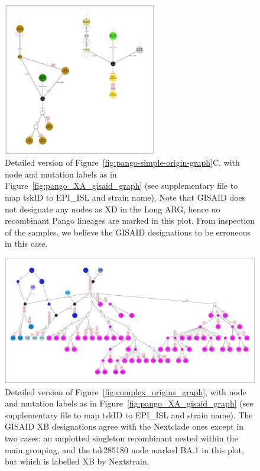 \documentclass{article}
\begin{document}
\begin{figure} \centering
\includegraphics[width=0.6\textwidth]{figures/Pango_XD_gisaid_large_graph.pdf}
\caption{\label{fig:pango_XD_gisaid_graph}
Detailed version of Figure~\ref{fig:pango-simple-origin-graph}C, with node and mutation labels as in
Figure~\ref{fig:pango_XA_gisaid_graph} (see supplementary file \protect{}
to map tskID to EPI\_ISL and strain name).
Note that GISAID does not designate any nodes as XD in the Long ARG, hence no recombinant Pango lineages
are marked in this plot. From inspection of the samples, we believe the GISAID designations to be erroneous
in this case.
}
\end{figure}

\begin{figure} \centering
\includegraphics[width=\textwidth]{figures/Pango_XB_gisaid_large_graph.pdf}
\caption{\label{fig:pango_XB_gisaid_graph}
Detailed version of Figure~\ref{fig:complex_origins_graph}, with node and mutation labels as in
Figure~\ref{fig:pango_XA_gisaid_graph} (see supplementary file \protect{}
to map tskID to EPI\_ISL and strain name).
The GISAID XB designations agree with the Nextclade ones except in two cases: an unplotted
singleton recombinant nested within the main grouping, and the tsk285180 node marked BA.1 in this plot,
but which is labelled XB by Nextstrain.
}
\end{figure}

\end{document}

